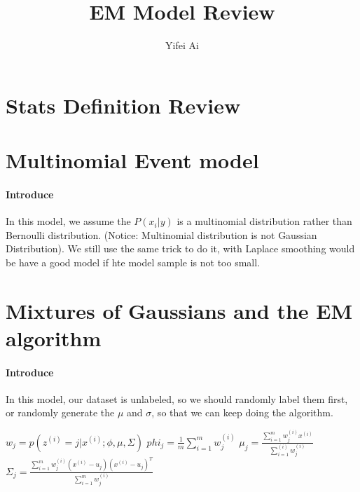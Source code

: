 \documentclass[12pt]{article}
\begin{document}
\title{EM Model Review}
\author{Yifei Ai}
\maketitle

\section{Stats Definition Review}

\section{Multinomial Event model}

\paragraph{Introduce}

In this model, we assume the $P(x_i|y)$ is a multinomial distribution rather than Bernoulli distribution. (Notice: Multinomial distribution is not Gaussian Distribution). We still use the same trick to do it, with Laplace smoothing would be have a good model if hte model sample is not too small.


\section{Mixtures of Gaussians and the EM algorithm}

\paragraph{Introduce}
In this model, our dataset is unlabeled, so we should randomly label them first, or randomly generate the $\mu$ and $\sigma$, so that we can keep doing the algorithm.

\begin{algorithm}
  \begin{algorithmic}
      \State $w_j = p(z^{(i)} = j|x^{(i)}; \phi,\mu,\Sigma)$
    \EndFor
    \State $phi_j = \frac{1}{m}\sum_{i=1}^m w_j^{(i)}$
    \State $\mu_j = \frac{\sum_{i=1}^mw_j^{(i)}x^{(i)}}{\sum_{i=1}^{(i)}w_j^{(i)}}$
    \State $\Sigma_j = \frac{\sum_{i=1}^mw_j^{(i)}(x^{(i)}-u_j)(x^{(i)}-u_j)^T}{\sum_{i=1}^mw_j^{(i)}}$
  \end{algorithmic}
\end{algorithm}
\end{document}
